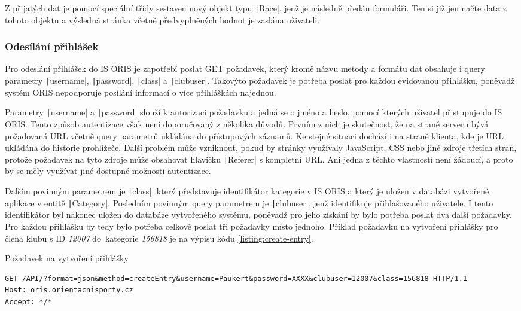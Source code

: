 Z přijatých dat je pomocí speciální třídy sestaven nový objekt typu \texttt|Race|, jenž je následně předán formuláři. Ten si již jen načte data z tohoto objektu a výsledná stránka včetně předvyplněných hodnot je zaslána uživateli.

\subsubsection{Odesílání přihlášek}
Pro odeslání přihlášek do IS ORIS je zapotřebí poslat GET požadavek, který kromě názvu metody a formátu dat obsahuje i query parametry \texttt|username|, \texttt|password|, \texttt|class| a \texttt|clubuser|. Takovýto požadavek je potřeba poslat pro každou evidovanou přihlášku, poněvadž systém ORIS nepodporuje posílání informací o více přihláškách najednou.

Parametry \texttt|username| a \texttt|password| slouží k autorizaci požadavku a jedná se o jméno a heslo, pomocí kterých uživatel přistupuje do IS ORIS. Tento způsob autentizace však není doporučovaný z několika důvodů. Prvním z nich je skutečnost, že na straně serveru bývá požadovaná URL včetně query parametrů ukládána do přístupových záznamů. Ke stejné situaci dochází i na straně klienta, kde je URL ukládána do historie prohlížeče. Další problém může vzniknout, pokud by stránky využívaly JavaScript, CSS nebo jiné zdroje třetích stran, protože požadavek na tyto zdroje může obsahovat hlavičku \texttt|Referer| s kompletní URL. \cite{query-parameters-security} Ani jedna z těchto vlastností není žádoucí, a proto by se měly využívat jiné dostupné možnosti autentizace.

Dalším povinným parametrem je \texttt|class|, který představuje identifikátor kategorie v IS ORIS a který je uložen v databázi vytvořené aplikace v entitě \texttt|Category|. Posledním povinným query parametrem je \texttt|clubuser|, jenž identifikuje přihlašovaného uživatele. I tento identifikátor byl nakonec uložen do databáze vytvořeného systému, poněvadž pro jeho získání by bylo potřeba poslat dva další požadavky. Pro každou přihlášku by tedy bylo potřeba celkově poslat tři požadavky místo jednoho. Příklad požadavku na vytvoření přihlášky pro člena klubu s ID \emph{12007} do~kategorie \emph{156818} je na výpisu kódu \ref{listing:create-entry}.

\begin{listing}[h]
    \caption{Požadavek na vytvoření přihlášky}\label{listing:create-entry}
    \begin{verbatim}
GET /API/?format=json&method=createEntry&username=Paukert&password=XXXX&clubuser=12007&class=156818 HTTP/1.1
Host: oris.orientacnisporty.cz
Accept: */*
    \end{verbatim}
\end{listing}
\vspace{-6mm}
